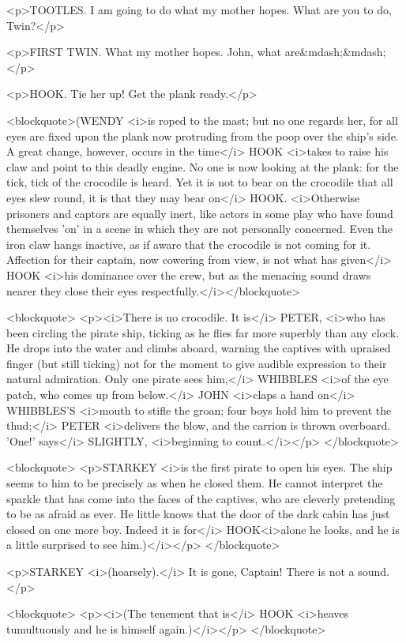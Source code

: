 <p>TOOTLES. I am going to do what my mother hopes. What are you to do, Twin?</p>

<p>FIRST TWIN. What my mother hopes. John, what are&mdash;&mdash;</p>

<p>HOOK. Tie her up! Get the plank ready.</p>

<blockquote>(WENDY <i>is roped to the mast; but no one regards her, for all eyes are fixed upon the plank now protruding from the poop over the ship's side. A great change, however, occurs in the time</i> HOOK <i>takes to raise his claw and point to this deadly engine. No one is now looking at the plank: for the tick, tick of the crocodile is heard. Yet it is not to bear on the crocodile that all eyes slew round, it is that they may bear on</i> HOOK. <i>Otherwise prisoners and captors are equally inert, like actors in some play who have found themselves 'on' in a scene in which they are not personally concerned. Even the iron claw hangs inactive, as if aware that the crocodile is not coming for it. Affection for their captain, now cowering from view, is not what has given</i> HOOK <i>his dominance over the crew, but as the menacing sound draws nearer they close their eyes respectfully.</i></blockquote>

<blockquote> <p><i>There is no crocodile. It is</i> PETER, <i>who has been circling the pirate ship, ticking as he flies far more superbly than any clock. He drops into the water and climbs aboard, warning the captives with upraised finger (but still ticking) not for the moment to give audible expression to their natural admiration. Only one pirate sees him,</i> WHIBBLES <i>of the eye patch, who comes up from below.</i> JOHN <i>claps a hand on</i> WHIBBLES'S <i>mouth to stifle the groan; four boys hold him to prevent the thud;</i> PETER <i>delivers the blow, and the carrion is thrown overboard. 'One!' says</i> SLIGHTLY, <i>beginning to count.</i></p> </blockquote>

<blockquote> <p>STARKEY <i>is the first pirate to open his eyes. The ship seems to him to be precisely as when he closed them. He cannot interpret the sparkle that has come into the faces of the captives, who are cleverly pretending to be as afraid as ever. He little knows that the door of the dark cabin has just closed on one more boy. Indeed it is for</i> HOOK<i>alone he looks, and he is a little surprised to see him.)</i></p> </blockquote>

<p>STARKEY <i>(hoarsely).</i> It is gone, Captain! There is not a sound.</p>

<blockquote> <p><i>(The tenement that is</i> HOOK <i>heaves tumultuously and he is himself again.)</i></p> </blockquote>

